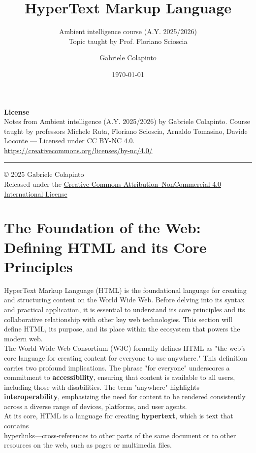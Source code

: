 \documentclass{scrbook}
\title{HyperText Markup Language}
\subtitle{Ambient intelligence course (A.Y. 2025/2026)\\Topic taught by Prof. Floriano Scioscia}
\author{Gabriele Colapinto}
\date{\today}
\begin{document}
\maketitle
\thispagestyle{empty}

{\Large\textbf{License}} \\
{Notes from Ambient intelligence (A.Y. 2025/2026) by Gabriele Colapinto. 
Course taught by professors Michele Ruta, Floriano Scioscia, Arnaldo Tomasino, Davide Loconte — 
Licensed under CC BY-NC 4.0.\\
\url{https://creativecommons.org/licenses/by-nc/4.0/}}

\vspace*{\fill}
\rule{\textwidth}{0.2pt}
\small{© 2025 Gabriele Colapinto \\
Released under the \href{https://creativecommons.org/licenses/by-nc/4.0/}{Creative Commons Attribution–NonCommercial 4.0 International License}}

\clearpage

\tableofcontents

\chapter{The Foundation of the Web: Defining HTML and its Core Principles}

HyperText Markup Language (HTML) is the foundational language for creating and structuring content on the World Wide Web. Before delving into its syntax and practical application, it is essential to understand its core principles and its collaborative relationship with other key web technologies. This section will define HTML, its purpose, and its place within the ecosystem that powers the modern web. \\

The World Wide Web Consortium (W3C) formally defines HTML as "the web's core language for creating content for everyone to use anywhere." This definition carries two profound implications. The phrase "for everyone" underscores a commitment to \textbf{accessibility}, ensuring that content is available to all users, including those with disabilities. The term "anywhere" highlights \textbf{interoperability}, emphasizing the need for content to be rendered consistently across a diverse range of devices, platforms, and user agents. \\

At its core, HTML is a language for creating \textbf{hypertext}, which is text that contains\\ hyperlinks—cross-references to other parts of the same document or to other resources on the web, such as pages or multimedia files. \\
\end{document}
